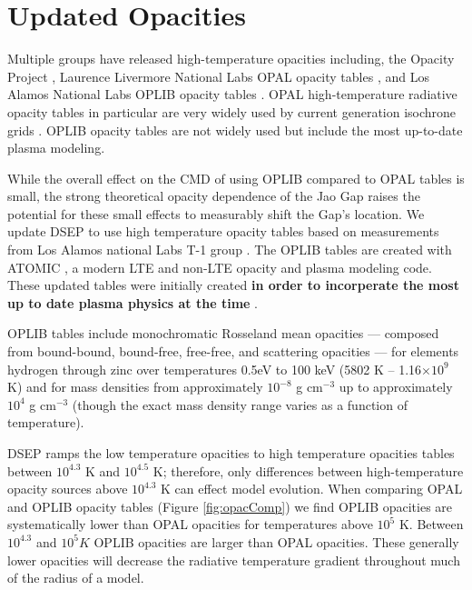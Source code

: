 \section{Updated Opacities}\label{sec:opac}
Multiple groups have released high-temperature opacities including, the Opacity
Project \citep[OP][]{Seaton1994}, Laurence Livermore National Labs OPAL opacity
tables \citep{Iglesias1996}, and Los Alamos National Labs OPLIB opacity tables
\citep{Colgan2016}. OPAL high-temperature radiative opacity tables in
particular are very widely used by current generation isochrone grids
\citep[e.g. Dartmouth, MIST, \& StarEvol, ][]{Dotter2008,Choi2016,Amard2019}.
OPLIB opacity tables \citep{Colgan2016} are not widely used but include the
most up-to-date plasma modeling.

While the overall effect on the CMD of using OPLIB compared to OPAL tables is
small, the strong theoretical opacity dependence of the Jao Gap raises the
potential for these small effects to measurably shift the Gap's location. We
update DSEP to use high temperature opacity tables based on measurements from
Los Alamos national Labs T-1 group \citep[OPLIB,][]{Colgan2016}. The OPLIB
tables are created with ATOMIC \citep{Magee2004,Hakel2006,Fontes2016}, a modern
LTE and non-LTE opacity and plasma modeling code. These updated tables were
initially created \textbf{in order to incorperate the most up to date plasma
physics at the time} \citep{Bahcall2005}. 

OPLIB tables include monochromatic Rosseland mean opacities --- composed from
bound-bound, bound-free, free-free, and scattering opacities --- for elements
hydrogen through zinc over temperatures 0.5eV to 100 keV (5802 K -- 1.16$\times
10 ^{9}$ K) and for mass densities from approximately $10^{-8}$ g cm$^{-3}$ up
to approximately $10^{4}$ g cm$^{-3}$ (though the exact mass density range
varies as a function of temperature). 

DSEP ramps the \citet{Ferguson2005} low temperature opacities to high
temperature opacities tables between $10^{4.3}$ K and $10^{4.5}$ K; therefore,
only differences between high-temperature opacity sources above $10^{4.3}$ K
can effect model evolution. When comparing OPAL and OPLIB opacity tables
(Figure \ref{fig:opacComp}) we find OPLIB opacities are systematically lower
than OPAL opacities for temperatures above $10^{5}$ K. Between $10^{4.3}$ and
$10^{5} K$ OPLIB opacities are larger than OPAL opacities. These generally
lower opacities will decrease the radiative temperature gradient throughout
much of the radius of a model.

